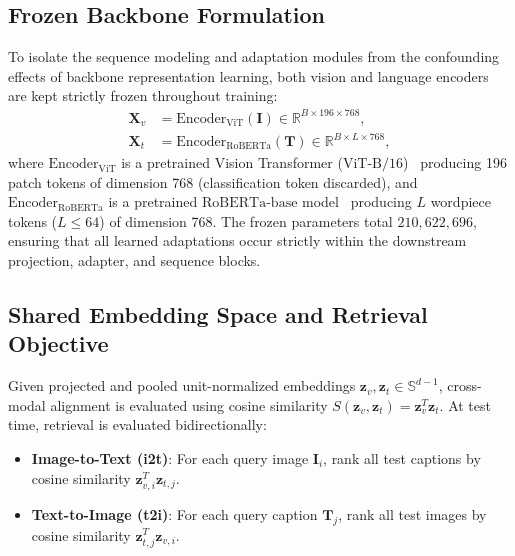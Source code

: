 \documentclass[conference]{IEEEtran}
\begin{document}
\subsection{Frozen Backbone Formulation}
To isolate the sequence modeling and adaptation modules from the confounding effects of backbone representation learning, both vision and language encoders are kept strictly frozen throughout training:
\begin{align}
\label{eq:frozen_vision}
\mathbf{X}_v &= \mathrm{Encoder}_{\mathrm{ViT}}(\mathbf{I}) \in \mathbb{R}^{B \times 196 \times 768}, \\
\label{eq:frozen_lang}
\mathbf{X}_t &= \mathrm{Encoder}_{\mathrm{RoBERTa}}(\mathbf{T}) \in \mathbb{R}^{B \times L \times 768},
\end{align}
where $\mathrm{Encoder}_{\mathrm{ViT}}$ is a pretrained Vision Transformer ($\mathrm{ViT\text{-}B/16}$)~\cite{dosovitskiy2021image} producing 196 patch tokens of dimension 768 (classification token discarded), and $\mathrm{Encoder}_{\mathrm{RoBERTa}}$ is a pretrained $\mathrm{RoBERTa\text{-}base}$ model~\cite{liu2019roberta} producing $L$ wordpiece tokens ($L \le 64$) of dimension 768. The frozen parameters total $210,622,696$, ensuring that all learned adaptations occur strictly within the downstream projection, adapter, and sequence blocks.

\subsection{Shared Embedding Space and Retrieval Objective}
Given projected and pooled unit-normalized embeddings $\mathbf{z}_v, \mathbf{z}_t \in \mathbb{S}^{d-1}$, cross-modal alignment is evaluated using cosine similarity $S(\mathbf{z}_v, \mathbf{z}_t) = \mathbf{z}_v^T \mathbf{z}_t$. At test time, retrieval is evaluated bidirectionally:
\begin{itemize}
    \item \textbf{Image-to-Text (i2t)}: For each query image $\mathbf{I}_i$, rank all test captions by cosine similarity $\mathbf{z}_{v, i}^T \mathbf{z}_{t, j}$.
    \item \textbf{Text-to-Image (t2i)}: For each query caption $\mathbf{T}_j$, rank all test images by cosine similarity $\mathbf{z}_{t, j}^T \mathbf{z}_{v, i}$.
\end{itemize}
\end{document}
